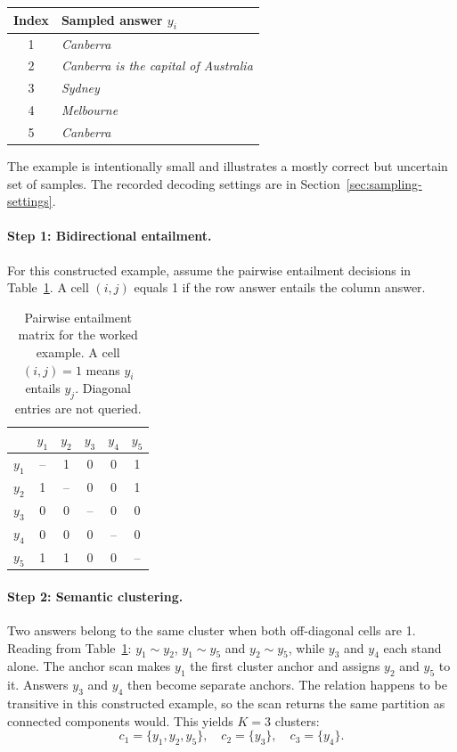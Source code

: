\begin{center}
\begin{tabular}{cl}
\hline
Index & Sampled answer $y_i$ \\
\hline
1 & \emph{Canberra} \\
2 & \emph{Canberra is the capital of Australia} \\
3 & \emph{Sydney} \\
4 & \emph{Melbourne} \\
5 & \emph{Canberra} \\
\hline
\end{tabular}
\end{center}

The example is intentionally small and illustrates a mostly correct but
uncertain set of samples. The recorded decoding settings are in
Section~\ref{sec:sampling-settings}.

\paragraph{Step 1: Bidirectional entailment.}
For this constructed example, assume the pairwise entailment decisions in
Table~\ref{tab:entailment_example}. A
cell $(i,j)$ equals 1 if the row answer entails the column answer.

\begin{table}[ht]
\centering
\caption{Pairwise entailment matrix for the worked example.
         A cell $(i,j)=1$ means $y_i$ entails $y_j$.
         Diagonal entries are not queried.}
\label{tab:entailment_example}
\begin{tabular}{c|ccccc}
       & $y_1$ & $y_2$ & $y_3$ & $y_4$ & $y_5$ \\\hline
$y_1$ &  --   &   1   &   0   &   0   &   1   \\
$y_2$ &   1   &  --   &   0   &   0   &   1   \\
$y_3$ &   0   &   0   &  --   &   0   &   0   \\
$y_4$ &   0   &   0   &   0   &  --   &   0   \\
$y_5$ &   1   &   1   &   0   &   0   &  --   \\
\end{tabular}
\end{table}

\paragraph{Step 2: Semantic clustering.}
Two answers belong to the same cluster when both off-diagonal cells are 1.
Reading from Table~\ref{tab:entailment_example}: $y_1 \sim y_2$,
$y_1 \sim y_5$ and $y_2 \sim y_5$, while $y_3$ and $y_4$ each stand alone.
The anchor scan makes $y_1$ the first cluster anchor and assigns $y_2$ and
$y_5$ to it. Answers $y_3$ and $y_4$ then become separate anchors. The
relation happens to be transitive in this constructed example, so the scan
returns the same partition as connected components would. This yields $K=3$
clusters:
\[
  c_1 = \{y_1, y_2, y_5\},\quad
  c_2 = \{y_3\},\quad
  c_3 = \{y_4\}.
\]

